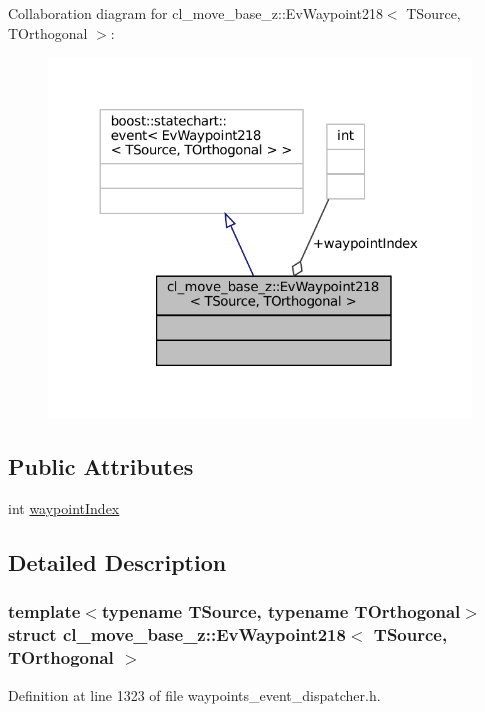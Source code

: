 Collaboration diagram for cl\+\_\+move\+\_\+base\+\_\+z\+:\+:Ev\+Waypoint218$<$ T\+Source, T\+Orthogonal $>$\+:
\nopagebreak
\begin{figure}[H]
\begin{center}
\leavevmode
\includegraphics[width=324pt]{structcl__move__base__z_1_1EvWaypoint218__coll__graph}
\end{center}
\end{figure}
\subsection*{Public Attributes}
\begin{DoxyCompactItemize}
\item 
int \hyperlink{structcl__move__base__z_1_1EvWaypoint218_a47f2afe7025f6c7932d7155e5a63b95f}{waypoint\+Index}
\end{DoxyCompactItemize}


\subsection{Detailed Description}
\subsubsection*{template$<$typename T\+Source, typename T\+Orthogonal$>$\newline
struct cl\+\_\+move\+\_\+base\+\_\+z\+::\+Ev\+Waypoint218$<$ T\+Source, T\+Orthogonal $>$}



Definition at line 1323 of file waypoints\+\_\+event\+\_\+dispatcher.\+h.



